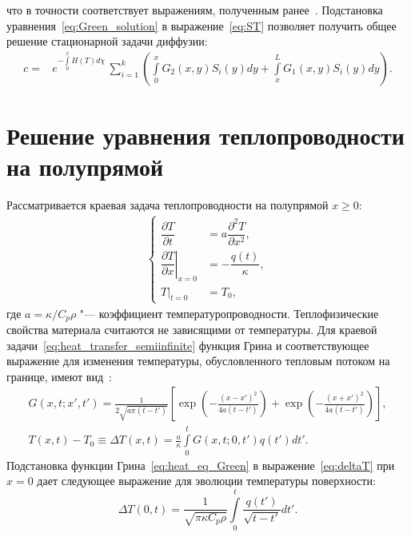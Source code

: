 что в точности соответствует выражениям, полученным ранее~\cite{Denis2022}. Подстановка уравнения~\eqref{eq:Green_solution} в выражение~\eqref{eq:ST} позволяет получить общее решение стационарной задачи диффузии:
\begin{align}
    c= & e^{-\int\limits_0^x H(T)d\chi}\,\sum\limits_{i=1}^k \left( \int\limits_0^x G_2(x,y)S_i(y)dy + \int\limits_x^L G_1(x,y)S_i(y)dy \right).\nonumber
\end{align}

\chapter{Решение уравнения теплопроводности на полупрямой}\label{app:E}

Рассматривается краевая задача теплопроводности на полупрямой \( x \geq 0 \):
\begin{align}
    \label{eq:heat_transfer_semiinfinite}
    \begin{cases}
        \dfrac{\partial T}{\partial t}                        & = a \dfrac{\partial^2 T}{\partial x^2}, \\[5pt]
        \left.\dfrac{\partial T}{\partial x}\right\vert_{x=0} & = -\dfrac{q(t)}{\kappa},                \\[5pt]
        \left. T \right\vert_{t=0}                            & = T_0,
    \end{cases}
\end{align}
где \( a = \kappa/C_p\rho \) "--- коэффициент температуропроводности. Теплофизические свойства материала считаются не зависящими от температуры. Для краевой задачи~\cref{eq:heat_transfer_semiinfinite} функция Грина и соответствующее выражение для изменения температуры, обусловленного тепловым потоком на границе, имеют вид~\cite{Bechtel1975}:
\begin{subequations}
    \begin{gather}
        G(x,t;x',t') = \frac{1}{2\sqrt{a\pi(t-t')}} \left[ \exp \left( -\frac{(x-x')^2}{4a(t-t')} \right) + \exp \left( -\frac{(x+x')^2}{4a(t-t')} \right) \right],\label{eq:heat_eq_Green}\\
        T(x,t)-T_0 \equiv \Delta T(x,t) = \frac{a}{\kappa} \int\limits_0^t G(x,t;0,t')q(t')dt'. \label{eq:deltaT}
    \end{gather}
\end{subequations}
Подстановка функции Грина~\cref{eq:heat_eq_Green} в выражение~\cref{eq:deltaT} при $x=0$ дает следующее выражение для эволюции температуры поверхности:
\begin{equation}
    \Delta T(0,t) = \frac{1}{\sqrt{\pi\kappa C_p \rho}} \int\limits_0^t \frac{q(t')}{\sqrt{t-t'}}dt'.
\end{equation}

